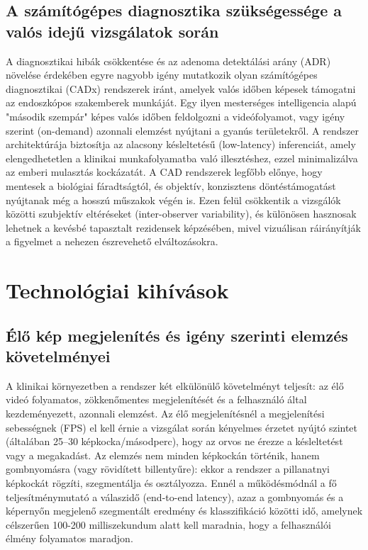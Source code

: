 \documentclass[12pt, a4paper]{report}
\begin{document}
\subsection{A számítógépes diagnosztika szükségessége a valós idejű vizsgálatok során}
A diagnosztikai hibák csökkentése és az adenoma detektálási arány (ADR) növelése érdekében egyre nagyobb igény mutatkozik olyan számítógépes diagnosztikai (CADx) rendszerek iránt, amelyek valós időben képesek támogatni az endoszkópos szakemberek munkáját. Egy ilyen mesterséges intelligencia alapú "második szempár" képes valós időben feldolgozni a videófolyamot, vagy igény szerint (on-demand) azonnali elemzést nyújtani a gyanús területekről. A rendszer architektúrája biztosítja az alacsony késleltetésű (low-latency) inferenciát, amely elengedhetetlen a klinikai munkafolyamatba való illesztéshez, ezzel minimalizálva az emberi mulasztás kockázatát. A CAD rendszerek legfőbb előnye, hogy mentesek a biológiai fáradtságtól, és objektív, konzisztens döntéstámogatást nyújtanak még a hosszú műszakok végén is. Ezen felül csökkentik a vizsgálók közötti szubjektív eltéréseket (inter-observer variability), és különösen hasznosak lehetnek a kevésbé tapasztalt rezidensek képzésében, mivel vizuálisan ráirányítják a figyelmet a nehezen észrevehető elváltozásokra.

\section{Technológiai kihívások}

\subsection{Élő kép megjelenítés és igény szerinti elemzés követelményei}
A klinikai környezetben a rendszer két elkülönülő követelményt teljesít: az élő videó folyamatos, zökkenőmentes megjelenítését és a felhasználó által kezdeményezett, azonnali elemzést. Az élő megjelenítésnél a megjelenítési sebességnek (FPS) el kell érnie a vizsgálat során kényelmes érzetet nyújtó szintet (általában 25--30 képkocka/másodperc), hogy az orvos ne érezze a késleltetést vagy a megakadást. Az elemzés nem minden képkockán történik, hanem gombnyomásra (vagy rövidített billentyűre): ekkor a rendszer a pillanatnyi képkockát rögzíti, szegmentálja és osztályozza. Ennél a működésmódnál a fő teljesítménymutató a válaszidő (end-to-end latency), azaz a gombnyomás és a képernyőn megjelenő szegmentált eredmény és klasszifikáció közötti idő, amelynek célszerűen 100-200 milliszekundum alatt kell maradnia, hogy a felhasználói élmény folyamatos maradjon.
\end{document}

